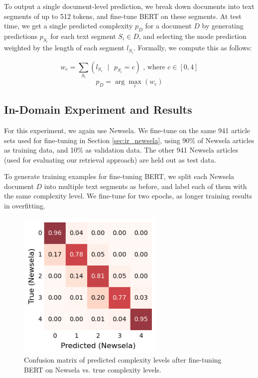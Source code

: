 \documentclass[thesis.tex]{subfiles}
\begin{document}
To output a single document-level prediction, we break down documents into text segments of up to 512 tokens, and fine-tune BERT on these segments. At test time, we get a single predicted complexity $p_D$ for a document $D$ by generating predictions $p_{S_i}$ for each text segment $S_i \in D$, and selecting the mode prediction weighted by the length of each segment $l_{S_i}$. Formally, we compute this as follows: 

\begin{equation*}
w_c = \sum_{S_i} (l_{S_i} \text{ } | \text{ } p_{S_i} = c) \text{ , where } c \in [0, 4]
\end{equation*}
\begin{equation*}
p_D = \arg\max_c(w_c)
\end{equation*}

\subsection{In-Domain Experiment and Results}

For this experiment, we again use Newsela. We fine-tune on the same 941 article sets used for fine-tuning in Section \ref{sec:ir_newsela}, using 90\% of Newsela articles as training data, and 10\% as validation data. The other 941 Newsela articles (used for evaluating our retrieval approach) are held out as test data.

To generate training examples for fine-tuning BERT, we split each Newsela document $D$ into multiple text segments as before, and label each of them with the same complexity level. We fine-tune for two epochs, as longer training results in overfitting.

\begin{figure}[bt]
    \centering
\includegraphics[width=7cm]{pictures/train_newsela_test_newsela.png}
\caption{Confusion matrix of predicted complexity levels after fine-tuning BERT on Newsela vs. true complexity levels.}
\label{table:comp_pred}
\end{figure}
\end{document}
